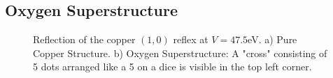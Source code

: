 \documentclass[a4paper]{scrartcl}
\numberwithin{equation}{section}
\numberwithin{figure}{section}
\numberwithin{table}{section}
\begin{document}
\subsection{Oxygen Superstructure}
\begin{figure} 
 \centering
{}
\hfill
{}
	\caption{\small Reflection of the copper $(1,0)$ reflex at $V=47.5$eV. a) Pure Copper Structure. b) Oxygen Superstructure: A "cross" consisting of 5 dots arranged like a 5 on a dice is visible in the top left corner.}
	\label{fig:super}
\end{figure}

 

\end{document}
